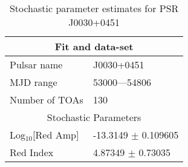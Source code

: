 \documentclass{article}
\begin{document}
\begin{table*}
\caption{Stochastic parameter estimates for PSR J0030+0451}
\begin{tabular}{ll}
\hline\hline
\multicolumn{2}{c}{Fit and data-set} \\ 
\hline
Pulsar name\dotfill & J0030+0451 \\ 
MJD range\dotfill & 53000---54806 \\ 
Number of TOAs\dotfill & 130 \\
\hline
\multicolumn{2}{c}{Stochastic Parameters} \\ 
\hline
Log$_{10}$[Red Amp] \dotfill & -13.3149 $\pm$ 0.109605  \\ 
Red Index \dotfill & 4.87349 $\pm$ 0.73035  \\ 
\hline
\end{tabular}
\label{Table:J0030+0451}
\end{table*} 
\end{document}
